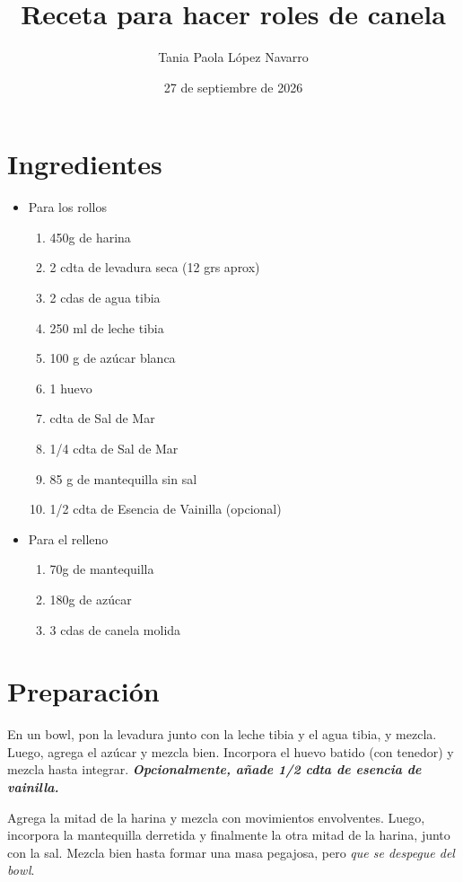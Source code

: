 \documentclass{article}
\title{\textbf{Receta para hacer roles de canela}}
\author{Tania Paola López Navarro}
\date{27 de septiembre de 2026}
\begin{document}
\maketitle

\section*{Ingredientes}
 \begin{itemize}
     \item Para los rollos
     \begin{enumerate}
        \item 450g de harina
        \item 2 cdta de levadura seca (12 grs aprox)
        \item2 cdas de agua tibia
        \item250 ml de leche tibia
        \item100 g de azúcar blanca
        \item 1 huevo
        \item cdta de Sal de Mar 
        \item 1/4 cdta de Sal de Mar
        \item85 g de mantequilla sin sal
        \item1/2  cdta de Esencia de Vainilla (opcional)
     \end{enumerate}

     \item Para el relleno
     \begin{enumerate}
         \item 70g de mantequilla
         \item 180g de azúcar
         \item 3 cdas de canela molida
     \end{enumerate}
          
 \end{itemize}

 \section{Preparación}
 En un bowl, pon la levadura junto con la leche tibia y el agua tibia, y mezcla. Luego, agrega el azúcar y mezcla bien. Incorpora el huevo batido (con tenedor) y mezcla hasta integrar. \textit{\textbf{Opcionalmente, añade 1/2 cdta de esencia de vainilla.
 }}
 
 Agrega la mitad de la harina y mezcla con movimientos envolventes. Luego, incorpora la mantequilla derretida y finalmente la otra mitad de la harina, junto con la sal. Mezcla bien hasta formar una masa pegajosa, pero \textit{que se despegue del bowl}. 
 
\end{document}
